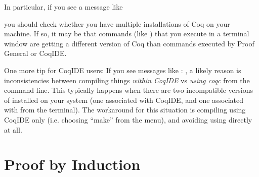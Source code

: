 \documentclass[12pt]{report}
\begin{document}
    In particular, if you see a message like


              
         


    you should check whether you have multiple installations of Coq on
    your machine.  If so, it may be that commands (like ) that
    you execute in a terminal window are getting a different version of
    Coq than commands executed by Proof General or CoqIDE.


    One more tip for CoqIDE users: If you see messages like :
        , a likely reason is
    inconsistencies between compiling things \textit{within CoqIDE} vs \textit{using
    coqc} from the command line.  This typically happens when there are
    two incompatible versions of  installed on your system (one
    associated with CoqIDE, and one associated with  from the
    terminal).  The workaround for this situation is compiling using
    CoqIDE only (i.e. choosing ``make'' from the menu), and avoiding
    using  directly at all. \begin{coqdoccode}
\coqdocemptyline
\end{coqdoccode}
\section{Proof by Induction}
\end{document}
